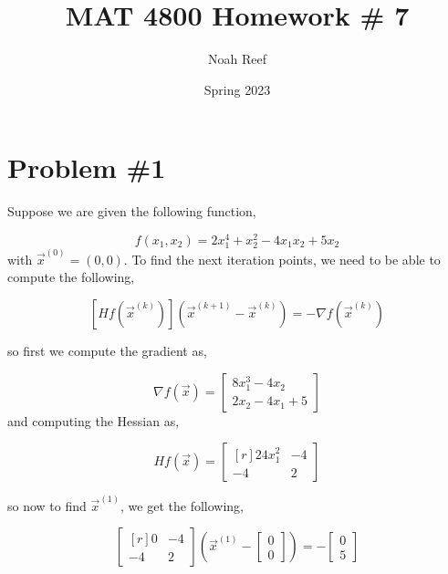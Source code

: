 \documentclass{article}
\title{MAT 4800 Homework \# 7 }
\author{Noah Reef }
\date{Spring 2023}
\newcommand{\xk}[1]{\vec{x}^{(#1)}}
\begin{document}
\maketitle

\section*{Problem \#1}
Suppose we are given the following function,

\begin{equation*}
    f(x_1,x_2) = 2x_1^4 + x_2^2 -4x_1x_2 + 5x_2
\end{equation*}
with $\vec{x}^{(0)} = (0,0)$. To find the next iteration points, we need to be able to compute the following,

\begin{equation*}
    \left[Hf\left(\xk{k}\right)\right]\left(\xk{k+1} - \xk{k}\right) = -\nabla f(\xk{k})
\end{equation*}

so first we compute the gradient as,

\begin{equation*}
    \nabla f(\vec{x}) = \begin{bmatrix*}8x_1^3-4x_2 \\ 2x_2 - 4x_1 + 5\end{bmatrix*}
\end{equation*}
and computing the Hessian as,

\begin{equation*}
   Hf(\vec{x}) = \begin{bmatrix*}[r]24x_1^2 & -4 \\ -4 & 2\end{bmatrix*}
\end{equation*}

so now to find $\xk{1}$, we get the following,

\begin{equation*}
    \begin{bmatrix*}[r]0 & -4 \\ -4 & 2\end{bmatrix*}\left(\xk{1} - \begin{bmatrix*}
        0 \\ 0
    \end{bmatrix*}\right) = -\begin{bmatrix*}0 \\ 5\end{bmatrix*}
\end{equation*}
\end{document}

